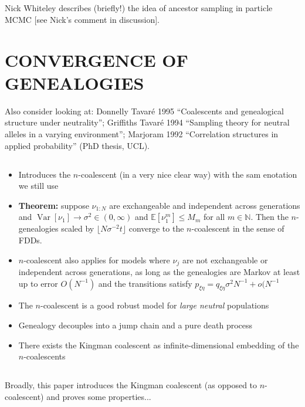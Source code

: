 \documentclass{article}
\newcommand{\E}{\mathbb{E}}
\newcommand{\V}{\operatorname{Var}}
\begin{document}
\subsection*{\cite{andrieu2010}}
Nick Whiteley describes (briefly!) the idea of ancestor sampling in particle MCMC [see Nick's comment in discussion].

%
\section*{CONVERGENCE OF GENEALOGIES}

Also consider looking at: Donnelly Tavar\'e 1995 ``Coalescents and genealogical structure under neutrality''; Griffiths Tavar\'e 1994 ``Sampling theory for neutral alleles in a varying environment''; Marjoram 1992 ``Correlation structures in applied probability'' (PhD thesis, UCL).

\subsection*{\cite{kingman1982gene}}
\begin{itemize}
\item Introduces the $n$-coalescent (in a very nice clear way) with the sam enotation we still use
\item \textbf{Theorem:} suppose $\nu_{1:N}$ are exchangeable and independent across generations and $\V[\nu_1]\to\sigma^2 \in (0,\infty)$ and $\E[\nu_1^m] \leq M_m$ for all $m\in\mathbb{N}$. Then the $n$-genealogies scaled by $\lfloor N\sigma^{-2}t \rfloor$ converge to the $n$-coalescent in the sense of FDDs.
\item $n$-coalescent also applies for models where $\nu_j$ are not exchangeable or independent across generations, as long as the genealogies are Markov at least up to error $O(N^{-1})$ and the transitions satisfy $p_{\xi\eta} = q_{\xi\eta}\sigma^2 N^{-1} + o(N^{-1}$
\item The $n$-coalescent is a good robust model for \emph{large neutral} populations
\item Genealogy decouples into a jump chain and a pure death process
\item There exists the Kingman coalescent as infinite-dimensional embedding of the $n$-coalescents
\end{itemize}


\subsection*{\cite{kingman1982coal}}
Broadly, this paper introduces the Kingman coalescent (as opposed to $n$-coalescent) and proves some properties...
\end{document}
